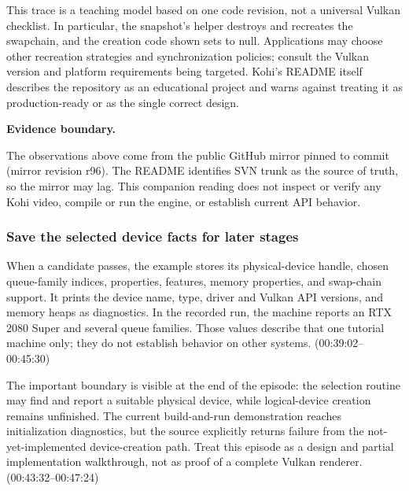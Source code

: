This trace is a teaching model based on one code revision, not a universal Vulkan checklist. In particular, the snapshot's helper destroys and recreates the swapchain, and the creation code shown sets  to null. Applications may choose other recreation strategies and synchronization policies; consult the Vulkan version and platform requirements being targeted. Kohi's README itself describes the repository as an educational project and warns against treating it as production-ready or as the single correct design.

\textbf{Evidence boundary.}

The observations above come from the public GitHub mirror pinned to commit  (mirror revision r96). The README identifies SVN trunk as the source of truth, so the mirror may lag. This companion reading does not inspect or verify any Kohi video, compile or run the engine, or establish current API behavior.

\subsubsection{Save the selected device facts for later stages}\label{06-engine-ii-ch025-save-the-selected-device-facts-for-later-stages}

\hypertarget{06-engine-ii-ch025-save-the-selected-device-facts-for-later-stages}{}

When a candidate passes, the example stores its physical-device handle, chosen queue-family indices, properties, features, memory properties, and swap-chain support. It prints the device name, type, driver and Vulkan API versions, and memory heaps as diagnostics. In the recorded run, the machine reports an RTX 2080 Super and several queue families. Those values describe that one tutorial machine only; they do not establish behavior on other systems. (00:39:02--00:45:30)

The important boundary is visible at the end of the episode: the selection routine may find and report a suitable physical device, while logical-device creation remains unfinished. The current build-and-run demonstration reaches initialization diagnostics, but the source explicitly returns failure from the not-yet-implemented device-creation path. Treat this episode as a design and partial implementation walkthrough, not as proof of a complete Vulkan renderer. (00:43:32--00:47:24)


